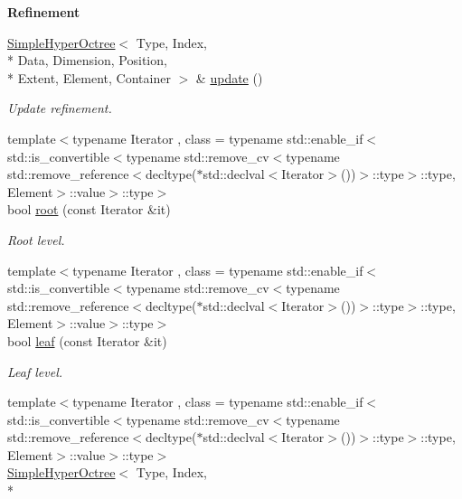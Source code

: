 \begin{Indent}{\bf Refinement}\par
\begin{DoxyCompactItemize}
\item 
\hyperlink{exceptionmagrathea_1_1SimpleHyperOctree}{Simple\-Hyper\-Octree}$<$ Type, Index, \\*
Data, Dimension, Position, \\*
Extent, Element, Container $>$ \& \hyperlink{exceptionmagrathea_1_1SimpleHyperOctree_a7e3fee5e84ba3546af3f48c1f95606e2}{update} ()
\begin{DoxyCompactList}\small\item\em Update refinement. \end{DoxyCompactList}\item 
{\footnotesize template$<$typename Iterator , class  = typename std\-::enable\-\_\-if$<$std\-::is\-\_\-convertible$<$typename std\-::remove\-\_\-cv$<$typename std\-::remove\-\_\-reference$<$decltype($\ast$std\-::declval$<$\-Iterator$>$())$>$\-::type$>$\-::type, Element$>$\-::value$>$\-::type$>$ }\\bool \hyperlink{exceptionmagrathea_1_1SimpleHyperOctree_aed9d244e291a647202e37c3c4ae8d741}{root} (const Iterator \&it)
\begin{DoxyCompactList}\small\item\em Root level. \end{DoxyCompactList}\item 
{\footnotesize template$<$typename Iterator , class  = typename std\-::enable\-\_\-if$<$std\-::is\-\_\-convertible$<$typename std\-::remove\-\_\-cv$<$typename std\-::remove\-\_\-reference$<$decltype($\ast$std\-::declval$<$\-Iterator$>$())$>$\-::type$>$\-::type, Element$>$\-::value$>$\-::type$>$ }\\bool \hyperlink{exceptionmagrathea_1_1SimpleHyperOctree_a0ccadf72b8ef56d94f3de046eb382e02}{leaf} (const Iterator \&it)
\begin{DoxyCompactList}\small\item\em Leaf level. \end{DoxyCompactList}\item 
{\footnotesize template$<$typename Iterator , class  = typename std\-::enable\-\_\-if$<$std\-::is\-\_\-convertible$<$typename std\-::remove\-\_\-cv$<$typename std\-::remove\-\_\-reference$<$decltype($\ast$std\-::declval$<$\-Iterator$>$())$>$\-::type$>$\-::type, Element$>$\-::value$>$\-::type$>$ }\\\hyperlink{exceptionmagrathea_1_1SimpleHyperOctree}{Simple\-Hyper\-Octree}$<$ Type, Index, \\*

\end{DoxyCompactItemize}
\end{Indent}
